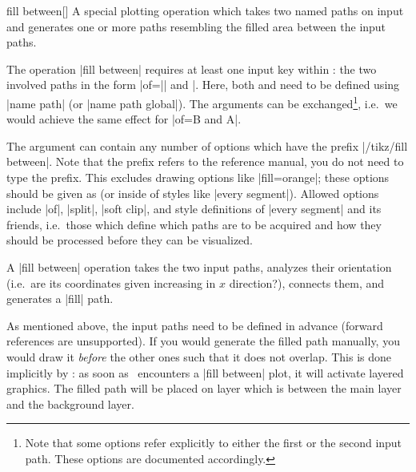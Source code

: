 \begin{addplotoperation}[]{fill between}{[]}
	A special plotting operation which takes two named paths on input and generates one or more paths resembling the filled area between the input paths.

\begin{codeexample}[]
\end{codeexample}
	The operation |fill between| requires at least one input key within : the two involved paths in the form |of=|| and |. Here, both  and  need to be defined using |name path| (or |name path global|). The arguments can be exchanged\footnote{Note that some options refer explicitly to either the first or the second input path. These options are documented accordingly.}, i.e.\ we would achieve the same effect for |of=B and A|.

	The argument  can contain any number of options which have the prefix |/tikz/fill between|. Note that the prefix refers to the reference manual, you do not need to type the prefix. This excludes drawing options like |fill=orange|; these options should be given as  (or inside of styles like |every segment|). Allowed options include |of|, |split|, |soft clip|, and style definitions of |every segment| and its friends, i.e.\ those which define which paths are to be acquired and how they should be processed before they can be visualized.

	A |fill between| operation takes the two input paths, analyzes their orientation (i.e.\ are its coordinates given increasing in $x$ direction?), connects them, and generates a |fill| path. 
	
	As mentioned above, the input paths need to be defined in advance (forward references are unsupported). If you would generate the filled path manually, you would draw it \emph{before} the other ones such that it does not overlap. This is done implicitly by \PGFPlots: as soon as \PGFPlots\ encounters a |fill between| plot, it will activate layered graphics. The filled path will be placed on layer  which is between the main layer and the background layer.\label{Layer!pre main} 


\end{addplotoperation}
